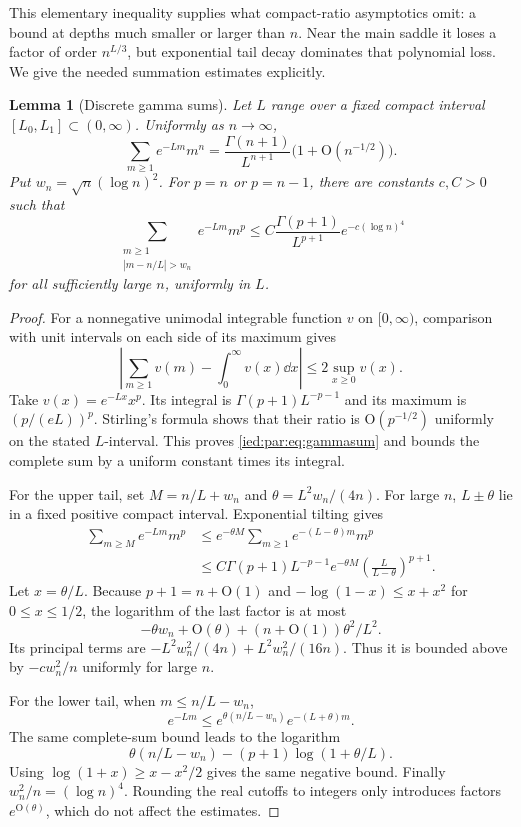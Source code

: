 \documentclass[11pt,letterpaper]{article}
\newtheorem{lemma}[theorem]{Lemma}
\theoremstyle{remark}\newtheorem{remark}[theorem]{Remark}
\newcommand{\Oh}{\mathrm O}\newcommand{\supp}{\operatorname{supp}}
\begin{document}
This elementary inequality supplies what compact-ratio asymptotics
omit: a bound at depths much smaller or larger than $n$.
Near the main saddle it loses a factor of order $n^{L/3}$, but
exponential tail decay dominates that polynomial loss.
We give the needed summation estimates explicitly.

\begin{lemma}[Discrete gamma sums]\label{ied:par:lem:gamma}
Let $L$ range over a fixed compact interval
$[L_0,L_1]\subset(0,\infty)$. Uniformly as $n\to\infty$,
\begin{equation}\label{ied:par:eq:gammasum}
 \sum_{m\ge1}e^{-Lm}m^n
 =\frac{\Gamma(n+1)}{L^{n+1}}
 \bigl(1+\Oh(n^{-1/2})\bigr).
\end{equation}
Put $w_n=\sqrt n(\log n)^2$. For $p=n$ or $p=n-1$, there are constants
$c,C>0$ such that
\begin{equation}\label{ied:par:eq:gammatail}
 \sum_{\substack{m\ge1\\|m-n/L|>w_n}}e^{-Lm}m^p
 \le C\frac{\Gamma(p+1)}{L^{p+1}}e^{-c(\log n)^4}
\end{equation}
for all sufficiently large $n$, uniformly in $L$.
\end{lemma}
\begin{proof}
For a nonnegative unimodal integrable function $v$ on $[0,\infty)$,
comparison with unit intervals on each side of its maximum gives
\[
 \left|\sum_{m\ge1}v(m)-\int_0^\infty v(x)\dd x\right|
 \le2\sup_{x\ge0}v(x).
\]
Take $v(x)=e^{-Lx}x^p$. Its integral is
$\Gamma(p+1)L^{-p-1}$ and its maximum is $(p/(eL))^p$.
Stirling's formula shows that their ratio is $\Oh(p^{-1/2})$
uniformly on the stated $L$-interval. This proves
\eqref{ied:par:eq:gammasum} and bounds the complete sum by a uniform constant
times its integral.

For the upper tail, set $M=n/L+w_n$ and
$\theta=L^2w_n/(4n)$. For large $n$, $L\pm\theta$ lie in a fixed
positive compact interval. Exponential tilting gives
\begin{align*}
 \sum_{m\ge M}e^{-Lm}m^p
 &\le e^{-\theta M}\sum_{m\ge1}e^{-(L-\theta)m}m^p\\
 &\le C\Gamma(p+1)L^{-p-1}
 e^{-\theta M}\left(\frac{L}{L-\theta}\right)^{p+1}.
\end{align*}
Let $x=\theta/L$. Because $p+1=n+\Oh(1)$ and
$-\log(1-x)\le x+x^2$ for $0\le x\le1/2$, the logarithm of the last
factor is at most
\[
 -\theta w_n+\Oh(\theta)+(n+\Oh(1))\theta^2/L^2.
\]
Its principal terms are
$-L^2w_n^2/(4n)+L^2w_n^2/(16n)$.
Thus it is bounded above by $-c w_n^2/n$ uniformly for large $n$.

For the lower tail, when $m\le n/L-w_n$,
\[
 e^{-Lm}\le e^{\theta(n/L-w_n)}e^{-(L+\theta)m}.
\]
The same complete-sum bound leads to the logarithm
\[
 \theta(n/L-w_n)-(p+1)\log(1+\theta/L).
\]
Using $\log(1+x)\ge x-x^2/2$ gives the same negative bound.
Finally $w_n^2/n=(\log n)^4$.
Rounding the real cutoffs to integers only introduces factors
$e^{\Oh(\theta)}$, which do not affect the estimates.
\end{proof}
\end{document}
